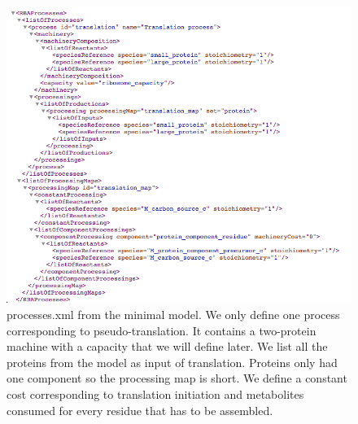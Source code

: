 \begin{figure}
  \centering
  \includegraphics[scale=0.6]{figures/processes_ex_2}
  \caption{processes.xml from the minimal model.
  We only define one process corresponding to pseudo-translation.
  It contains a two-protein machine with a capacity that we will define later.
  We list all the proteins from the model as input of translation.
  Proteins only had one component so the processing map is short.
  We define a constant cost corresponding to translation initiation
  and metabolites consumed for every residue that has to be assembled. }
  \label{fig:processes_ex_2}
\end{figure}
